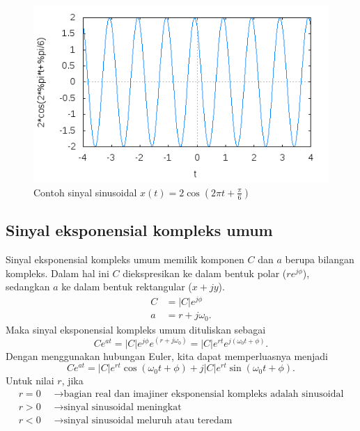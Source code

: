 \begin{figure}
\centering
\includegraphics[scale=0.4]{pict/sinusoidal}
\caption{Contoh sinyal sinusoidal $x(t)=2\cos (2\pi t+\frac{\pi}{6})$}
\end{figure}

\subsection{Sinyal eksponensial kompleks umum}
Sinyal eksponensial kompleks umum memilik komponen $C$ dan $a$ berupa bilangan kompleks. Dalam hal ini $C$ diekspresikan ke dalam bentuk polar ($re^{j \phi}$), sedangkan $a$ ke dalam bentuk rektangular ($x+jy$). 
\begin{align*}
C&=|C|e^{j\phi}\\
a&=r+j\omega_0.
\end{align*}
Maka sinyal eksponensial kompleks umum dituliskan sebagai
\begin{equation}
Ce^{at}=|C|e^{j\phi}e^{(r+j\omega_0)}=|C|e^{rt}e^{j(\omega_0 t+\phi)}.
\end{equation}
Dengan menggunakan hubungan Euler, kita dapat memperluasnya menjadi
\begin{equation}
Ce^{at}=|C|e^{rt} \cos(\omega_0 t+\phi)+j|C|e^{rt}\sin(\omega_0 t+\phi).
\end{equation}
Untuk nilai $r$, jika
\begin{align*}
r=0\;\;&\rightarrow \text{bagian real dan imajiner eksponensial kompleks adalah sinusoidal}\\
r>0\;\;&\rightarrow \text{sinyal sinusoidal meningkat}\\
r<0\;\;&\rightarrow \text{sinyal sinusoidal meluruh atau teredam}
\end{align*}

